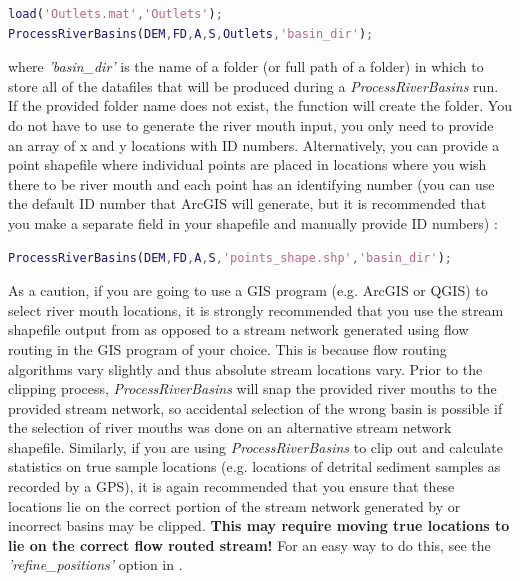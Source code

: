 \begin{lstlisting}[language=Matlab]
% Using output of BasinPicker to run ProcessRiverBasins
load('Outlets.mat','Outlets');
ProcessRiverBasins(DEM,FD,A,S,Outlets,'basin_dir');
\end{lstlisting}

\noindent
where \textit{'basin\_dir'} is the name of a folder (or full path of a folder) in which to store all of the datafiles that will be produced during a \textit{ProcessRiverBasins} run. If the provided folder name does not exist, the function will create the folder. You do not have to use  to generate the river mouth input, you only need to provide an array of x and y locations with ID numbers. Alternatively, you can provide a point shapefile where individual points are placed in locations where you wish there to be river mouth and each point has an identifying number (you can use the default ID number that ArcGIS will generate, but it is recommended that you make a separate field in your shapefile and manually provide ID numbers) :

\begin{lstlisting}[language=Matlab]
% Using a point shapefile to run ProcessRiverBasins
ProcessRiverBasins(DEM,FD,A,S,'points_shape.shp','basin_dir');
\end{lstlisting}

\noindent
As a caution, if you are going to use a GIS program (e.g. ArcGIS or QGIS) to select river mouth locations, it is strongly recommended that you use the stream shapefile output from  as opposed to a stream network generated using flow routing in the GIS program of your choice. This is because flow routing algorithms vary slightly and thus  absolute stream locations vary. Prior to the clipping process, \textit{ProcessRiverBasins} will snap the provided river mouths to the provided stream network, so accidental selection of the wrong basin is possible if the selection of river mouths was done on an alternative stream network shapefile. Similarly, if you are using \textit{ProcessRiverBasins} to clip out and calculate statistics on true sample locations (e.g. locations of detrital sediment samples as recorded by a GPS), it is again recommended that you ensure that these locations lie on the correct portion of the stream network generated by  or incorrect basins may be clipped. \textbf{This may require moving true locations to lie on the correct flow routed stream!} For an easy way to do this, see the \textit{'refine\_positions'} option in .

